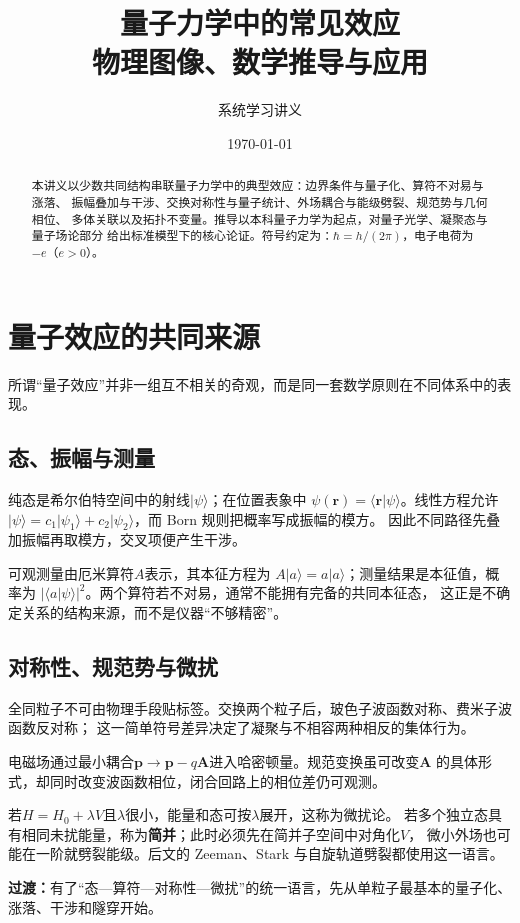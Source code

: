 \documentclass[12pt,a4paper,openany,fontset=fandol]{ctexrep}
\title{\Huge 量子力学中的常见效应\\[0.6em]
  \Large 物理图像、数学推导与应用}
\author{系统学习讲义}
\date{\today}
\newcommand{\trans}[1]{\par\medskip\noindent\textcolor{blue!55!black}{\textbf{过渡：}}#1\par\medskip}
\begin{document}
\maketitle
\begin{abstract}
本讲义以少数共同结构串联量子力学中的典型效应：边界条件与量子化、算符不对易与涨落、
振幅叠加与干涉、交换对称性与量子统计、外场耦合与能级劈裂、规范势与几何相位、
多体关联以及拓扑不变量。推导以本科量子力学为起点，对量子光学、凝聚态与量子场论部分
给出标准模型下的核心论证。符号约定为：$\hbar=h/(2\pi)$，电子电荷为$-e$（$e>0$）。
\end{abstract}
\tableofcontents

\chapter{量子效应的共同来源}
所谓“量子效应”并非一组互不相关的奇观，而是同一套数学原则在不同体系中的表现。

\section{态、振幅与测量}
纯态是希尔伯特空间中的射线$|\psi\rangle$；在位置表象中
$\psi(\bm r)=\langle\bm r|\psi\rangle$。线性方程允许
$|\psi\rangle=c_1|\psi_1\rangle+c_2|\psi_2\rangle$，而 Born 规则把概率写成振幅的模方。
因此不同路径先叠加振幅再取模方，交叉项便产生干涉。

可观测量由厄米算符$A$表示，其本征方程为
$A|a\rangle=a|a\rangle$；测量结果是本征值，概率为
$|\langle a|\psi\rangle|^2$。两个算符若不对易，通常不能拥有完备的共同本征态，
这正是不确定关系的结构来源，而不是仪器“不够精密”。

\section{对称性、规范势与微扰}
全同粒子不可由物理手段贴标签。交换两个粒子后，玻色子波函数对称、费米子波函数反对称；
这一简单符号差异决定了凝聚与不相容两种相反的集体行为。

电磁场通过最小耦合$\bm p\to\bm p-q\bm A$进入哈密顿量。规范变换虽可改变$\bm A$
的具体形式，却同时改变波函数相位，闭合回路上的相位差仍可观测。

若$H=H_0+\lambda V$且$\lambda$很小，能量和态可按$\lambda$展开，这称为微扰论。
若多个独立态具有相同未扰能量，称为\textbf{简并}；此时必须先在简并子空间中对角化$V$，
微小外场也可能在一阶就劈裂能级。后文的 Zeeman、Stark 与自旋轨道劈裂都使用这一语言。
\trans{有了“态—算符—对称性—微扰”的统一语言，先从单粒子最基本的量子化、涨落、干涉和隧穿开始。}
\end{document}
